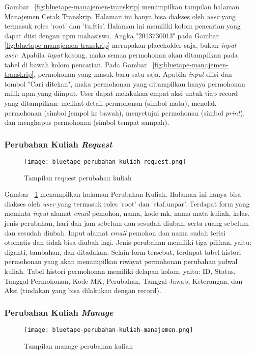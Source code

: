 	Gambar~ \ref{fig:bluetape-manajemen-transkrip} menampilkan tampilan halaman Manajemen Cetak Transkrip. Halaman ini hanya bisa diakses oleh \textit{user} yang termasuk roles 'root' dan 'tu.ftis'. Halaman ini memiliki kolom pencarian yang dapat diisi dengan npm mahasiswa. Angka "2013730013" pada Gambar~ \ref{fig:bluetape-manajemen-transkrip} merupakan placeholder saja, bukan \textit{input} \textit{user}. Apabila \textit{input} kosong, maka semua permohonan akan ditampilkan pada tabel di bawah kolom pencarian. Pada Gambar~ \ref{fig:bluetape-manajemen-transkrip}, permohonan yang masuk baru satu saja. Apabila \textit{input} diisi dan tombol "Cari ditekan", maka permohonan yang ditampilkan hanya permohonan milik npm yang diinput. User dapat melakukan empat aksi untuk tiap record yang ditampilkan: melihat detail permohonan (simbol mata), menolak permohonan (simbol jempol ke bawah), menyetujui permohonan (simbol \textit{print}), dan menghapus permohonan (simbol tempat sampah).
	
	\subsubsection{Perubahan Kuliah \textit{Request}}
	\begin{figure}[H]
		\centering  
		\texttt{[image: bluetape-perubahan-kuliah-request.png]}  
		\caption[Tampilan request perubahan kuliah]{Tampilan request perubahan kuliah} 
		\label{fig:bluetape-perubahan-kuliah-request} 
	\end{figure}
	
	Gambar~ \ref{fig:bluetape-perubahan-kuliah-request} menampilkan halaman Perubahan Kuliah. Halaman ini hanya bisa diakses oleh \textit{user} yang termasuk roles 'root' dan 'staf.unpar'. Terdapat form yang meminta \textit{input} alamat \textit{email} pemohon, nama, kode mk, nama mata kuliah, kelas, jenis perubahan, hari dan jam sebelum dan sesudah diubah, serta ruang sebelum dan sesudah diubah. Input alamat \textit{email} pemohon dan nama sudah terisi otomatis dan tidak bisa diubah lagi. Jenis perubahan memiliki tiga pilihan, yaitu: diganti, tambahan, dan ditadakan. Selain form tersebut, terdapat tabel histori permohonan yang akan menampilkan riwayat permohonan perubahan jadwal kuliah. Tabel histori permohonan memiliki delapan kolom, yaitu: ID, Status, Tanggal Permohonan, Kode MK, Perubahan, Tanggal Jawab, Keterangan, dan Aksi (tindakan yang bisa dilakukan dengan record).
	
	\subsubsection{Perubahan Kuliah \textit{Manage}}
	\begin{figure}[H]
		\centering  
		\texttt{[image: bluetape-perubahan-kuliah-manajemen.png]}  
		\caption[Tampilan manage perubahan kuliah]{Tampilan manage perubahan kuliah} 
		\label{fig:bluetape-perubahan-kuliah-manajemen} 
	\end{figure}
	
